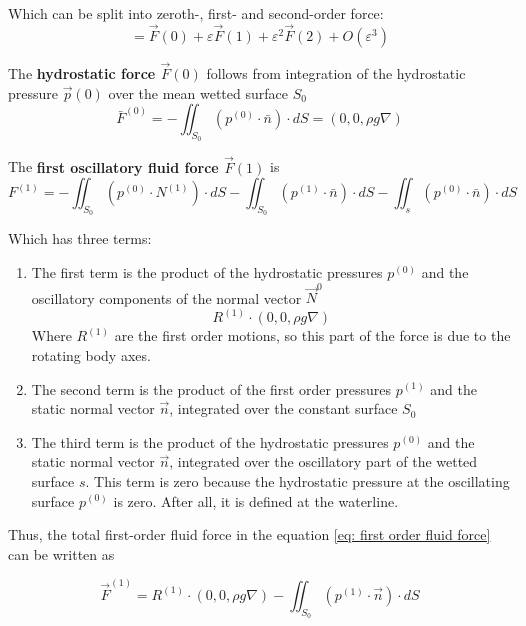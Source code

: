 Which can be split into zeroth-, first- and second-order force:
\begin{equation}
=\vec{F}(0)+\varepsilon \vec{F}(1)+\varepsilon^{2} \vec{F}(2)+O\left(\varepsilon^{3}\right)
\end{equation}

The \textbf{hydrostatic force $\vec{F}(0)$} follows from integration of the hydrostatic pressure $\vec{p}(0)$ over the mean wetted surface $S_0$
\begin{equation}
\bar{F}^{(0)}=-\iint_{S_{0}}\left(p^{(0)} \cdot \bar{n}\right) \cdot d S = (0,0,\rho g \nabla)
\end{equation}

The \textbf{first oscillatory fluid force $\vec{F}(1)$} is
\begin{equation}
F^{(1)}=-\iint_{S_{0}}\left(p^{(0)} \cdot N^{(1)}\right) \cdot d S-\iint_{S_{0}}\left(p^{(1)} \cdot \bar{n}\right) \cdot d S 
-\iint_{s}\left(p^{(0)} \cdot \bar{n}\right) \cdot d S
\label{eq: first order fluid force}
\end{equation}

Which has three terms:
\begin{enumerate}
    \item The first term is the product of the hydrostatic pressures $p^{(0)}$ and the oscillatory components of the normal vector $\vec{N}^{0}$
    \begin{equation}
        R^{(1)}\cdot  (0,0,\rho g \nabla)
    \end{equation}
    Where $R^{(1)}$ are the first order motions, so this part of the force is due to the rotating body axes.
    \item The second term is the product of the first order pressures $p^{(1)}$ and the static normal vector $\vec{n}$, integrated over the constant surface $S_0$
    \item The third term is the product of the hydrostatic pressures $p^{(0)}$ and the static normal vector $\vec{n}$, integrated over the oscillatory part of the wetted surface $s$. This term is zero because the hydrostatic pressure at the oscillating surface $p^(0)$ is zero. After all, it is defined at the waterline.
\end{enumerate}

Thus, the total first-order fluid force in the equation \ref{eq: first order fluid force} can be written as

\begin{equation}
    \vec{F}^{(1)}=R^{(1)} \cdot(0,0, \rho g \nabla)-\iint_{S_{0}}\left(p^{(1)} \cdot \vec{n}\right) \cdot d S
\end{equation}


